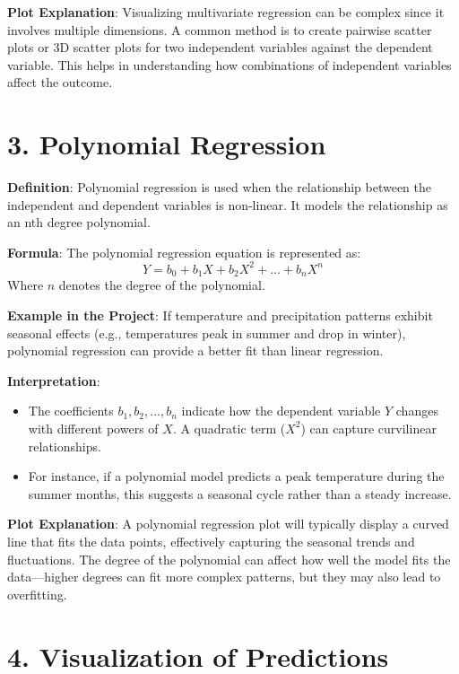 \documentclass{article}
\begin{document}
\textbf{Plot Explanation}: Visualizing multivariate regression can be complex since it involves multiple dimensions. A common method is to create pairwise scatter plots or 3D scatter plots for two independent variables against the dependent variable. This helps in understanding how combinations of independent variables affect the outcome.

\section{3. Polynomial Regression}

\textbf{Definition}: Polynomial regression is used when the relationship between the independent and dependent variables is non-linear. It models the relationship as an nth degree polynomial.

\textbf{Formula}: The polynomial regression equation is represented as:
\begin{equation}
Y = b_0 + b_1X + b_2X^2 + ... + b_nX^n 
\end{equation}
Where $n$ denotes the degree of the polynomial.

\textbf{Example in the Project}: If temperature and precipitation patterns exhibit seasonal effects (e.g., temperatures peak in summer and drop in winter), polynomial regression can provide a better fit than linear regression. 

\textbf{Interpretation}: 
\begin{itemize}
    \item The coefficients $b_1, b_2, ..., b_n$ indicate how the dependent variable $Y$ changes with different powers of $X$. A quadratic term ($X^2$) can capture curvilinear relationships.
    \item For instance, if a polynomial model predicts a peak temperature during the summer months, this suggests a seasonal cycle rather than a steady increase.
\end{itemize}

\textbf{Plot Explanation}: A polynomial regression plot will typically display a curved line that fits the data points, effectively capturing the seasonal trends and fluctuations. The degree of the polynomial can affect how well the model fits the data—higher degrees can fit more complex patterns, but they may also lead to overfitting.

\section{4. Visualization of Predictions}
\end{document}
